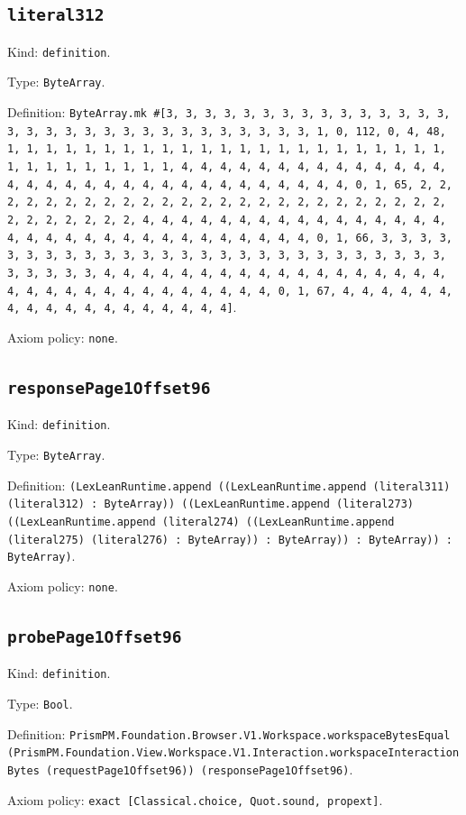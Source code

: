 \documentclass[11pt]{article}
\begin{document}
\subsection*{\texttt{literal312}}
\noindent Kind: \texttt{definition}.\par
\noindent Type: \texttt{ByteArray}.\par
\noindent Definition: \texttt{ByteArray.mk \#[3, 3, 3, 3, 3, 3, 3, 3, 3, 3, 3, 3, 3, 3, 3, 3, 3, 3, 3, 3, 3, 3, 3, 3, 3, 3, 3, 3, 3, 3, 3, 1, 0, 112, 0, 4, 48, 1, 1, 1, 1, 1, 1, 1, 1, 1, 1, 1, 1, 1, 1, 1, 1, 1, 1, 1, 1, 1, 1, 1, 1, 1, 1, 1, 1, 1, 1, 1, 1, 4, 4, 4, 4, 4, 4, 4, 4, 4, 4, 4, 4, 4, 4, 4, 4, 4, 4, 4, 4, 4, 4, 4, 4, 4, 4, 4, 4, 4, 4, 4, 4, 0, 1, 65, 2, 2, 2, 2, 2, 2, 2, 2, 2, 2, 2, 2, 2, 2, 2, 2, 2, 2, 2, 2, 2, 2, 2, 2, 2, 2, 2, 2, 2, 2, 2, 2, 4, 4, 4, 4, 4, 4, 4, 4, 4, 4, 4, 4, 4, 4, 4, 4, 4, 4, 4, 4, 4, 4, 4, 4, 4, 4, 4, 4, 4, 4, 4, 4, 0, 1, 66, 3, 3, 3, 3, 3, 3, 3, 3, 3, 3, 3, 3, 3, 3, 3, 3, 3, 3, 3, 3, 3, 3, 3, 3, 3, 3, 3, 3, 3, 3, 3, 3, 4, 4, 4, 4, 4, 4, 4, 4, 4, 4, 4, 4, 4, 4, 4, 4, 4, 4, 4, 4, 4, 4, 4, 4, 4, 4, 4, 4, 4, 4, 4, 4, 0, 1, 67, 4, 4, 4, 4, 4, 4, 4, 4, 4, 4, 4, 4, 4, 4, 4, 4, 4, 4]}.\par
\noindent Axiom policy: \texttt{none}.\par
\subsection*{\texttt{responsePage1Offset96}}
\noindent Kind: \texttt{definition}.\par
\noindent Type: \texttt{ByteArray}.\par
\noindent Definition: \texttt{(LexLeanRuntime.append ((LexLeanRuntime.append (literal311) (literal312) : ByteArray)) ((LexLeanRuntime.append (literal273) ((LexLeanRuntime.append (literal274) ((LexLeanRuntime.append (literal275) (literal276) : ByteArray)) : ByteArray)) : ByteArray)) : ByteArray)}.\par
\noindent Axiom policy: \texttt{none}.\par
\subsection*{\texttt{probePage1Offset96}}
\noindent Kind: \texttt{definition}.\par
\noindent Type: \texttt{Bool}.\par
\noindent Definition: \texttt{PrismPM.Foundation.Browser.V1.Workspace.workspaceBytesEqual (PrismPM.Foundation.View.Workspace.V1.Interaction.workspaceInteractionBytes (requestPage1Offset96)) (responsePage1Offset96)}.\par
\noindent Axiom policy: \texttt{exact [Classical.choice, Quot.sound, propext]}.\par
\end{document}
